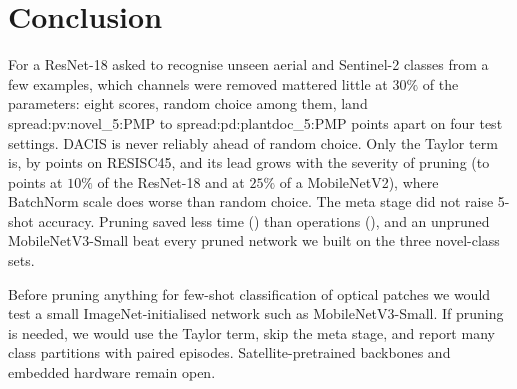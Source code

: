\section{Conclusion}
\label{sec:conclusion}

For a ResNet-18 asked to recognise unseen aerial and Sentinel-2 classes from a few examples, which channels were removed mattered little at $30\%$ of the parameters: eight scores, random choice among them, land \num{spread:pv:novel_5:PMP} to \num{spread:pd:plantdoc_5:PMP} points apart on four test settings. DACIS is never reliably ahead of random choice. Only the Taylor term is, by  points on RESISC45, and its lead grows with the severity of pruning (to  points at $10\%$ of the ResNet-18 and  at $25\%$ of a MobileNetV2), where BatchNorm scale does worse than random choice. The meta stage did not raise 5-shot accuracy. Pruning saved less time () than operations (), and an unpruned MobileNetV3-Small beat every pruned network we built on the three novel-class sets.

Before pruning anything for few-shot classification of optical patches we would test a small ImageNet-initialised network such as MobileNetV3-Small. If pruning is needed, we would use the Taylor term, skip the meta stage, and report many class partitions with paired episodes. Satellite-pretrained backbones and embedded hardware remain open.
